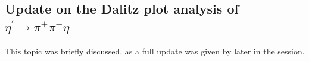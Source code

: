 \documentclass{aip-cp}
\begin{document}
\subsection{Update on the Dalitz plot analysis of $\eta^{\prime} \to \pi^+ \pi^- \eta$}
% 
This topic was briefly discussed, as a full update was given by later in the session.
\end{document}
